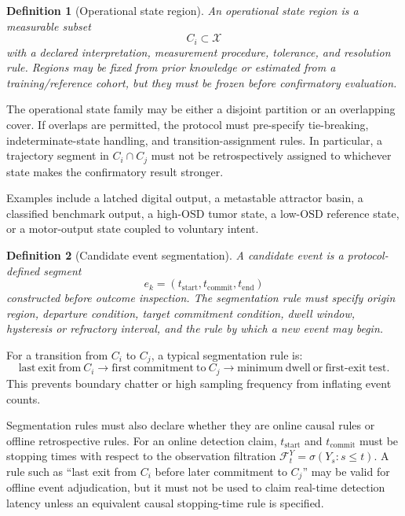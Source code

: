 \documentclass[11pt,a4paper]{article}
\newtheorem{definition}{Definition}
\newcommand{\OSD}{\ensuremath{\mathrm{OSD}}}
\newcommand{\1}{\mathbf{1}}
\begin{document}
\begin{definition}[Operational state region]
An operational state region is a measurable subset
\[
  C_i \subset \mathcal{X}
\]
with a declared interpretation, measurement procedure, tolerance, and resolution rule. Regions may be fixed from prior knowledge or estimated from a training/reference cohort, but they must be frozen before confirmatory evaluation.
\end{definition}

The operational state family may be either a disjoint partition or an overlapping cover. If overlaps are permitted, the protocol must pre-specify tie-breaking, indeterminate-state handling, and transition-assignment rules. In particular, a trajectory segment in $C_i\cap C_j$ must not be retrospectively assigned to whichever state makes the confirmatory result stronger.

Examples include a latched digital output, a metastable attractor basin, a classified benchmark output, a high-\OSD{} tumor state, a low-\OSD{} reference state, or a motor-output state coupled to voluntary intent.

\begin{definition}[Candidate event segmentation]
A candidate event is a protocol-defined segment
\[
  e_k=(t_{\mathrm{start}},t_{\mathrm{commit}},t_{\mathrm{end}})
\]
constructed before outcome inspection. The segmentation rule must specify origin region, departure condition, target commitment condition, dwell window, hysteresis or refractory interval, and the rule by which a new event may begin.
\end{definition}

For a transition from $C_i$ to $C_j$, a typical segmentation rule is:
\[
  \mathrm{last\ exit\ from\ } C_i
  \rightarrow
  \mathrm{first\ commitment\ to\ } C_j
  \rightarrow
  \mathrm{minimum\ dwell\ or\ first\mbox{-}exit\ test}.
\]
This prevents boundary chatter or high sampling frequency from inflating event counts.

Segmentation rules must also declare whether they are online causal rules or offline retrospective rules. For an online detection claim, $t_{\mathrm{start}}$ and $t_{\mathrm{commit}}$ must be stopping times with respect to the observation filtration $\mathcal{F}^Y_t=\sigma(Y_s:s\leq t)$. A rule such as ``last exit from $C_i$ before later commitment to $C_j$'' may be valid for offline event adjudication, but it must not be used to claim real-time detection latency unless an equivalent causal stopping-time rule is specified.
\end{document}
